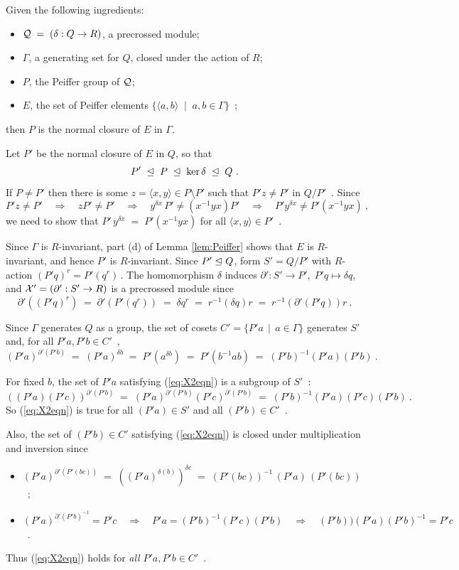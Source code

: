 \begin{prop}
Given the following ingredients:
\begin{itemize}
\item
$\mathcal{Q} \;=\; (\delta : Q \to R)$, a precrossed module;
\item
$\Gamma$, a generating set for $Q$, closed under the action of $R$;
\item
$P$, the Peiffer group of $\mathcal{Q}$;
\item
$E$, the set of Peiffer elements  
$\{\langle a,b \rangle \;\mid\; a,b \in \Gamma\}$~;
\end{itemize}
then  $P$  is the normal closure of $E$ in $\Gamma$.
\end{prop}
\begin{pf}
Let  $P'$  be the normal closure of  $E$  in  $Q$,  so that
$$
P' \;\trianglelefteq\; P \;\trianglelefteq\; \ker\delta \;\trianglelefteq\; Q~.
$$
If  $P \neq P'$  then there is some
$z = \langle x,y \rangle \in P \setminus P'$
such that
$P'z \neq P'$  in  $Q/P'$~.
Since
$$
P'z \neq P' \quad\Rightarrow\quad
zP' \neq P' \quad\Rightarrow\quad
y^{\delta x}\,P' \neq (x^{-1}yx)P' \quad\Rightarrow\quad
P'y^{\delta x} \neq P'(x^{-1}yx)~,
$$
we need to show that
$P'\,y^{\delta x} \;=\; P'(x^{-1}yx)$  
for all $\langle x,y \rangle \in P'$~.

Since  $\Gamma$  is  $R$-invariant,
part (d) of Lemma \ref{lem:Peiffer} shows that  $E$  is  $R$-invariant,
and hence  $P'$  is  $R$-invariant.
Since  $P' \trianglelefteq Q$,
form  $S' = Q/P'$  with $R$-action  $(P'q)^r = P'(q^r)\,$.
The homomorphism  $\delta$  induces
$\partial' : S' \to P',\; P'q \mapsto \delta q$,  and
$\mathcal{X}' = (\partial' : S' \to R)$  is a precrossed module since
$$
\partial'((P'q)^r) \;=\;
\partial'(P'(q^r)) \;=\;
\delta q^r \;=\;
r^{-1}(\delta q)r \;=\;
r^{-1}(\partial'(P'q))r~.
$$

Since  $\Gamma$  generates  $Q$  as a group,  the set of cosets
$C' = \{P'a \,\mid\, a \in \Gamma\}$
generates  $S'$ and, for all  $P'a,P'b \in C'$~,
\begin{equation}\label{eq:X2eqn}
(P'a)^{\partial'(P'b)} \;=\;
(P'a)^{\delta b} \;=\;
P'(a^{\delta b}) \;=\;
P'(b^{-1}ab) \;=\;
(P'b)^{-1}(P'a)(P'b)~.
\end{equation}

For fixed  $b$,  the set of  $P'a$  satisfying (\ref{eq:X2eqn})
is a subgroup of  $S'$~:
$$
((P'a)(P'c))^{\partial'(P'b)} \;=\;
(P'a)^{\partial'(P'b)}(P'c)^{\partial'(P'b)} \;=\;
(P'b)^{-1}(P'a)(P'c)(P'b)~.
$$
So (\ref{eq:X2eqn}) is true for all  $(P'a) \in S'$  and all  $(P'b) \in C'$~.

Also, the set of  $(P'b) \in C'$  satisfying  (\ref{eq:X2eqn})
is closed under multiplication and inversion since
\begin{itemize}
\item
$(P'a)^{\partial'(P'(bc))} \;=\;
((P'a)^{\delta(b)})^{\delta c} \;=\;
(P'(bc))^{-1}\,(P'a)\,(P'(bc))$~;
\item
$(P'a)^{\partial'(P'b)^{-1}} = P'c \quad\Rightarrow\quad
P'a=(P'b)^{-1}(P'c)(P'b) \quad\Rightarrow\quad
(P'b))(P'a)(P'b)^{-1} = P'c$~.
\end{itemize}
Thus (\ref{eq:X2eqn}) holds for \emph{all}  $P'a, P'b \in C'$~.
\end{pf}



